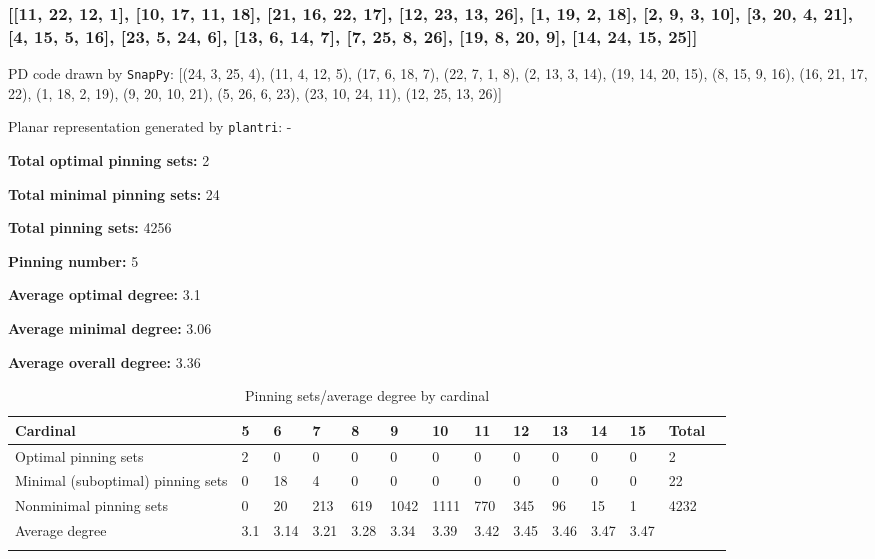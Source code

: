 \documentclass{article}%
\begin{document}
\newpage

\subsubsection{[[11, 22, 12, 1], [10, 17, 11, 18], [21, 16, 22, 17], [12, 23, 13, 26], [1, 19, 2, 18], [2, 9, 3, 10], [3, 20, 4, 21], [4, 15, 5, 16], [23, 5, 24, 6], [13, 6, 14, 7], [7, 25, 8, 26], [19, 8, 20, 9], [14, 24, 15, 25]]}

{\small\noindent PD code drawn by \texttt{SnapPy}: [(24, 3, 25, 4), (11, 4, 12, 5), (17, 6, 18, 7), (22, 7, 1, 8), (2, 13, 3, 14), (19, 14, 20, 15), (8, 15, 9, 16), (16, 21, 17, 22), (1, 18, 2, 19), (9, 20, 10, 21), (5, 26, 6, 23), (23, 10, 24, 11), (12, 25, 13, 26)]}

{\small\noindent Planar representation generated by \texttt{plantri}: -}

\begin{multicols}{2}
{\normalsize \noindent\textbf{Total optimal pinning sets:} 2

\noindent\textbf{Total minimal pinning sets:} 24

\noindent\textbf{Total pinning sets:} 4256

\noindent\textbf{Pinning number:} 5

}
\columnbreak

{\normalsize \noindent\textbf{Average optimal degree:} 3.1

\noindent\textbf{Average minimal degree:} 3.06

\noindent\textbf{Average overall degree:} 3.36

}
\end{multicols}

\begin{table}[ht]
	\caption{Pinning sets/average degree by cardinal}
	\centering
	\renewcommand{\arraystretch}{1.5}
	\begin{tabularx}{\textwidth}{lXXXXXXXXXXXXX}
		\toprule
			Cardinal & 5 & 6 & 7 & 8 & 9 & 10 & 11 & 12 & 13 & 14 & 15 & Total\\
			\hline
			Optimal pinning sets & 2 & 0 & 0 & 0 & 0 & 0 & 0 & 0 & 0 & 0 & 0 & 2 \\
			Minimal (suboptimal) pinning sets & 0 & 18 & 4 & 0 & 0 & 0 & 0 & 0 & 0 & 0 & 0 & 22 \\
			Nonminimal pinning sets & 0 & 20 & 213 & 619 & 1042 & 1111 & 770 & 345 & 96 & 15 & 1 & 4232 \\
			Average degree & 3.1 & 3.14 & 3.21 & 3.28 & 3.34 & 3.39 & 3.42 & 3.45 & 3.46 & 3.47 & 3.47 &  \\
		\bottomrule \\ 
	\end{tabularx}
\end{table}
\end{document}
